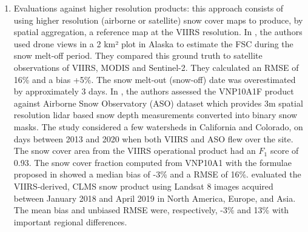 \documentclass[tc, manuscript]{copernicus}
\begin{document}
\begin{enumerate}
    \item Evaluations against higher resolution products: this approach consists of using higher resolution (airborne or satellite) snow cover maps to produce, by spatial aggregation, a reference map at the VIIRS resolution. In \citep{jacques-hamilton_measurement_2025}, the authors used drone views in a 2 km² plot in Alaska to estimate the FSC during the snow melt-off period. They compared this ground truth to satellite observations of VIIRS, MODIS and Sentinel-2.  They calculated an RMSE of 16\% and a bias +5\%. The snow melt-out (snow-off) date was overestimated by approximately 3 days. 
    In \citep{stillinger_landsat_2023}, the authors assessed the VNP10A1F product against Airborne Snow Observatory (ASO) dataset \citep{painter2016AirborneSnowObservatory} which provides 3m spatial resolution lidar based snow depth measurements converted into binary snow masks. The study considered a few watersheds in California and Colorado, on days between 2013 and 2020 when both VIIRS and ASO flew over the site. The snow cover area from the VIIRS operational product had an $F_1$ score of 0.93. The snow cover fraction computed from VNP10A1 with the formulae proposed in \citep{salomonson_development_2006} showed a median bias of -3\% and a RMSE of 16\%. 
    \citep{schwaizer2020SnowCoverExtentb} evaluated the VIIRS-derived, CLMS snow product using Landsat 8 images acquired between January 2018 and April 2019 in North America, Europe, and Asia. The mean bias and unbiased RMSE were, respectively, -3\% and 13\% with important regional differences. 

\end{enumerate}
\end{document}
